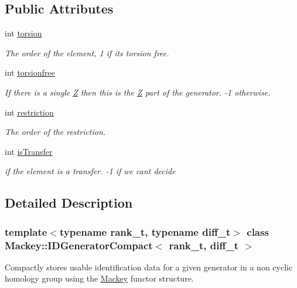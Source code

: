 \subsection*{Public Attributes}
\begin{DoxyCompactItemize}
\item 
int \hyperlink{classMackey_1_1IDGeneratorCompact_a7d93b99053f6f9d1d54eca457f1988fa}{torsion}
\begin{DoxyCompactList}\small\item\em The order of the element, 1 if it\textquotesingle{}s torsion free. \end{DoxyCompactList}\item 
int \hyperlink{classMackey_1_1IDGeneratorCompact_a986a1a67d8f8455cafc2aeeb2e45203e}{torsionfree}
\begin{DoxyCompactList}\small\item\em If there is a single \hyperlink{classZ}{Z} then this is the \hyperlink{classZ}{Z} part of the generator. -\/1 otherwise. \end{DoxyCompactList}\item 
int \hyperlink{classMackey_1_1IDGeneratorCompact_af3fa6fddc65d2cf84691da13773257ac}{restriction}
\begin{DoxyCompactList}\small\item\em The order of the restriction. \end{DoxyCompactList}\item 
int \hyperlink{classMackey_1_1IDGeneratorCompact_adec34bb801c96b0eb2e68a63e7b07948}{is\+Transfer}
\begin{DoxyCompactList}\small\item\em if the element is a transfer. -\/1 if we can\textquotesingle{}t decide \end{DoxyCompactList}\end{DoxyCompactItemize}


\subsection{Detailed Description}
\subsubsection*{template$<$typename rank\+\_\+t, typename diff\+\_\+t$>$\newline
class Mackey\+::\+I\+D\+Generator\+Compact$<$ rank\+\_\+t, diff\+\_\+t $>$}

Compactly stores usable identification data for a given generator in a non cyclic homology group using the \hyperlink{namespaceMackey}{Mackey} functor structure. 

